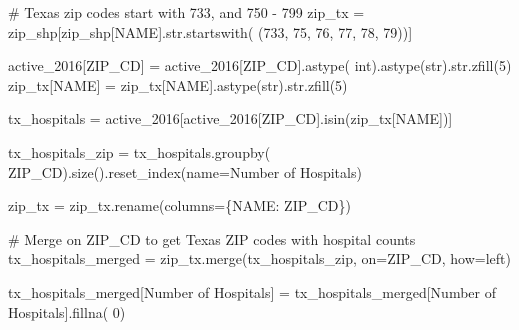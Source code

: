 \documentclass[
  letterpaper,
  DIV=11,
  numbers=noendperiod]{scrartcl}
\newenvironment{Shaded}{\begin{snugshade}}{\end{snugshade}}
\newcommand{\BuiltInTok}[1]{\textcolor[rgb]{0.00,0.23,0.31}{#1}}
\newcommand{\CommentTok}[1]{\textcolor[rgb]{0.37,0.37,0.37}{#1}}
\newcommand{\DecValTok}[1]{\textcolor[rgb]{0.68,0.00,0.00}{#1}}
\newcommand{\NormalTok}[1]{\textcolor[rgb]{0.00,0.23,0.31}{#1}}
\newcommand{\OperatorTok}[1]{\textcolor[rgb]{0.37,0.37,0.37}{#1}}
\newcommand{\StringTok}[1]{\textcolor[rgb]{0.13,0.47,0.30}{#1}}
\begin{document}
\begin{Shaded}
\begin{Highlighting}[]
\CommentTok{\# Texas zip codes start with 733, and 750 {-} 799}
\NormalTok{zip\_tx }\OperatorTok{=}\NormalTok{ zip\_shp[zip\_shp[}\StringTok{\textquotesingle{}NAME\textquotesingle{}}\NormalTok{].}\BuiltInTok{str}\NormalTok{.startswith(}
\NormalTok{    (}\StringTok{\textquotesingle{}733\textquotesingle{}}\NormalTok{, }\StringTok{\textquotesingle{}75\textquotesingle{}}\NormalTok{, }\StringTok{\textquotesingle{}76\textquotesingle{}}\NormalTok{, }\StringTok{\textquotesingle{}77\textquotesingle{}}\NormalTok{, }\StringTok{\textquotesingle{}78\textquotesingle{}}\NormalTok{, }\StringTok{\textquotesingle{}79\textquotesingle{}}\NormalTok{))]}

\NormalTok{active\_2016[}\StringTok{\textquotesingle{}ZIP\_CD\textquotesingle{}}\NormalTok{] }\OperatorTok{=}\NormalTok{ active\_2016[}\StringTok{\textquotesingle{}ZIP\_CD\textquotesingle{}}\NormalTok{].astype(}
    \BuiltInTok{int}\NormalTok{).astype(}\BuiltInTok{str}\NormalTok{).}\BuiltInTok{str}\NormalTok{.zfill(}\DecValTok{5}\NormalTok{)}
\NormalTok{zip\_tx[}\StringTok{\textquotesingle{}NAME\textquotesingle{}}\NormalTok{] }\OperatorTok{=}\NormalTok{ zip\_tx[}\StringTok{\textquotesingle{}NAME\textquotesingle{}}\NormalTok{].astype(}\BuiltInTok{str}\NormalTok{).}\BuiltInTok{str}\NormalTok{.zfill(}\DecValTok{5}\NormalTok{)}

\NormalTok{tx\_hospitals }\OperatorTok{=}\NormalTok{ active\_2016[active\_2016[}\StringTok{\textquotesingle{}ZIP\_CD\textquotesingle{}}\NormalTok{].isin(zip\_tx[}\StringTok{\textquotesingle{}NAME\textquotesingle{}}\NormalTok{])]}

\NormalTok{tx\_hospitals\_zip }\OperatorTok{=}\NormalTok{ tx\_hospitals.groupby(}
    \StringTok{\textquotesingle{}ZIP\_CD\textquotesingle{}}\NormalTok{).size().reset\_index(name}\OperatorTok{=}\StringTok{\textquotesingle{}Number of Hospitals\textquotesingle{}}\NormalTok{)}

\NormalTok{zip\_tx }\OperatorTok{=}\NormalTok{ zip\_tx.rename(columns}\OperatorTok{=}\NormalTok{\{}\StringTok{\textquotesingle{}NAME\textquotesingle{}}\NormalTok{: }\StringTok{\textquotesingle{}ZIP\_CD\textquotesingle{}}\NormalTok{\})}

\CommentTok{\# Merge on ZIP\_CD to get Texas ZIP codes with hospital counts}
\NormalTok{tx\_hospitals\_merged }\OperatorTok{=}\NormalTok{ zip\_tx.merge(tx\_hospitals\_zip, on}\OperatorTok{=}\StringTok{\textquotesingle{}ZIP\_CD\textquotesingle{}}\NormalTok{, how}\OperatorTok{=}\StringTok{\textquotesingle{}left\textquotesingle{}}\NormalTok{)}

\NormalTok{tx\_hospitals\_merged[}\StringTok{\textquotesingle{}Number of Hospitals\textquotesingle{}}\NormalTok{] }\OperatorTok{=}\NormalTok{ tx\_hospitals\_merged[}\StringTok{\textquotesingle{}Number of Hospitals\textquotesingle{}}\NormalTok{].fillna(}
    \DecValTok{0}\NormalTok{)}
\end{Highlighting}
\end{Shaded}
\end{document}
